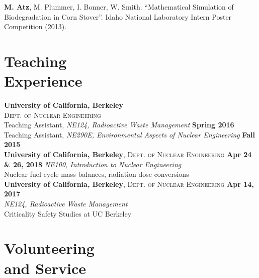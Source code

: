 \documentclass[margin,line]{resume}
\begin{document}
\begin{resume}
\begin{bibenum}
    \item \textbf{M. Atz}, M. Plummer, I. Bonner, W. Smith. ``Mathematical Simulation of Biodegradation in Corn Stover''. Idaho National Laboratory Intern Poster Competition (2013).

\end{bibenum}
\vspace{0mm}


\section{\mysidestyle Teaching\\Experience}
    
\textbf{University of California, Berkeley} \\
\textsc{Dept. of Nuclear Engineering} \\ 
Teaching Assistant, \textsl{NE124, Radioactive Waste Management} 
    \hfill \textbf{Spring 2016} \\
Teaching Assistant, \textsl{NE290E, Environmental Aspects of Nuclear Engineering} \hfill \textbf{Fall 2015} \vspace{6mm}\\
\textbf{University of California, Berkeley}, \textsc{Dept. of Nuclear Engineering} 
    \hfill \textbf{Apr 24 \& 26, 2018}
    \textsl{NE100, Introduction to Nuclear Engineering} \\
    Nuclear fuel cycle mass balances, radiation dose conversions
    \vspace{2mm} \\ 
\textbf{University of California, Berkeley}, \textsc{Dept. of Nuclear Engineering} \hfill \textbf{Apr 14, 2017} \\
    \textsl{NE124, Radioactive Waste Management} \\
    Criticality Safety Studies at UC Berkeley
    \vspace{2mm} \\ 
    

\section{\mysidestyle Volunteering\\and Service}


\end{resume}
\end{document}

